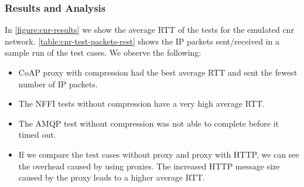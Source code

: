 \subsubsection{Results and Analysis}

In \cref{figure:cnr-results} we show the average RTT of the tests for the
emulated \gls{cnr} network. 
\cref{table:cnr-test-packets-rest} shows the IP packets sent/received in a sample
run of the test cases. We observe the following:

\begin{itemize}

    \item CoAP proxy with compression had the best average RTT and sent the
    fewest number of IP packets.

    \item The NFFI tests without compression have a very high average RTT.

    \item The AMQP test without compression was not able to
    complete before it timed out.

    \item If we compare the test cases without proxy and proxy with HTTP, we can
    see the overhead caused by using proxies. The increased HTTP message size
    caused by the proxy leads to a higher average RTT.

\end{itemize}

\begin{landscape}
    \begin{figure}
    \centering
    \begin{floatrow}
    \end{floatrow}
    \end{figure}
\end{landscape}

